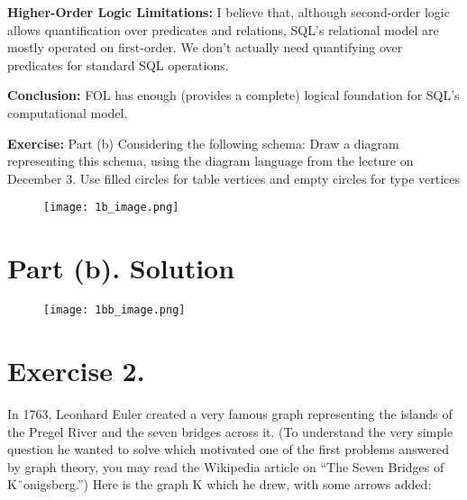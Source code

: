 \documentclass{article}
\begin{document}
\textbf{Higher-Order Logic Limitations:}
I believe that, although second-order logic allows quantification over predicates and relations, 
SQL's relational model are mostly operated on first-order. 
We don't actually need quantifying over predicates for standard SQL operations.

\vspace{1em}
\textbf{Conclusion:} FOL has enough (provides a complete) logical foundation for SQL's computational model.



\newpage

\begin{mdframed}
    \vspace{1em}
        \textbf{Exercise:} Part (b) Considering the following schema:
        Draw a diagram representing this schema, using the diagram language from the lecture on December
        3. Use filled circles for table vertices and empty circles for type vertices  
\end{mdframed}
\begin{figure}[h!]
    \centering
    \texttt{[image: 1b\_image.png]} %
    \label{fig:sample-image}
\end{figure}  

\section*{Part (b). Solution}




\begin{figure}[h!]
    \centering
    \texttt{[image: 1bb\_image.png]} %
    \label{fig:sample-image}
\end{figure}  


\newpage


\section*{Exercise 2. }

\begin{mdframed}In 1763, Leonhard Euler created a very famous graph representing the islands of the
    Pregel River and the seven bridges across it. (To understand the very simple question he wanted to
    solve which motivated one of the first problems answered by graph theory, you may read the Wikipedia
    article on “The Seven Bridges of K¨onigsberg.”) Here is the graph K which he drew, with some arrows
    added:
\end{mdframed}
   
\end{document}
